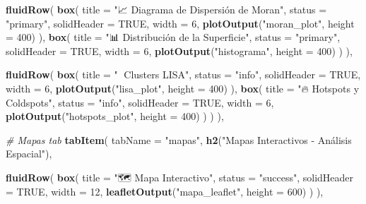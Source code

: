 \documentclass[
]{article}
\newenvironment{Shaded}{\begin{snugshade}}{\end{snugshade}}
\newcommand{\AttributeTok}[1]{\textcolor[rgb]{0.13,0.29,0.53}{#1}}
\newcommand{\CommentTok}[1]{\textcolor[rgb]{0.56,0.35,0.01}{\textit{#1}}}
\newcommand{\ConstantTok}[1]{\textcolor[rgb]{0.56,0.35,0.01}{#1}}
\newcommand{\DecValTok}[1]{\textcolor[rgb]{0.00,0.00,0.81}{#1}}
\newcommand{\FunctionTok}[1]{\textcolor[rgb]{0.13,0.29,0.53}{\textbf{#1}}}
\newcommand{\NormalTok}[1]{#1}
\newcommand{\StringTok}[1]{\textcolor[rgb]{0.31,0.60,0.02}{#1}}
\begin{document}
\begin{Shaded}
\begin{Highlighting}[]
        \FunctionTok{fluidRow}\NormalTok{(}
          \FunctionTok{box}\NormalTok{(}
            \AttributeTok{title =} \StringTok{"📈 Diagrama de Dispersión de Moran"}\NormalTok{, }
            \AttributeTok{status =} \StringTok{"primary"}\NormalTok{, }\AttributeTok{solidHeader =} \ConstantTok{TRUE}\NormalTok{,}
            \AttributeTok{width =} \DecValTok{6}\NormalTok{,}
            \FunctionTok{plotOutput}\NormalTok{(}\StringTok{"moran\_plot"}\NormalTok{, }\AttributeTok{height =} \DecValTok{400}\NormalTok{)}
\NormalTok{          ),}
          \FunctionTok{box}\NormalTok{(}
            \AttributeTok{title =} \StringTok{"📊 Distribución de la Superficie"}\NormalTok{, }
            \AttributeTok{status =} \StringTok{"primary"}\NormalTok{, }\AttributeTok{solidHeader =} \ConstantTok{TRUE}\NormalTok{,}
            \AttributeTok{width =} \DecValTok{6}\NormalTok{,}
            \FunctionTok{plotOutput}\NormalTok{(}\StringTok{"histograma"}\NormalTok{, }\AttributeTok{height =} \DecValTok{400}\NormalTok{)}
\NormalTok{          )}
\NormalTok{        ),}
        
        \FunctionTok{fluidRow}\NormalTok{(}
          \FunctionTok{box}\NormalTok{(}
            \AttributeTok{title =} \StringTok{"🧩 Clusters LISA"}\NormalTok{, }
            \AttributeTok{status =} \StringTok{"info"}\NormalTok{, }\AttributeTok{solidHeader =} \ConstantTok{TRUE}\NormalTok{,}
            \AttributeTok{width =} \DecValTok{6}\NormalTok{,}
            \FunctionTok{plotOutput}\NormalTok{(}\StringTok{"lisa\_plot"}\NormalTok{, }\AttributeTok{height =} \DecValTok{400}\NormalTok{)}
\NormalTok{          ),}
          \FunctionTok{box}\NormalTok{(}
            \AttributeTok{title =} \StringTok{"🔥 Hotspots y Coldspots"}\NormalTok{, }
            \AttributeTok{status =} \StringTok{"info"}\NormalTok{, }\AttributeTok{solidHeader =} \ConstantTok{TRUE}\NormalTok{,}
            \AttributeTok{width =} \DecValTok{6}\NormalTok{,}
            \FunctionTok{plotOutput}\NormalTok{(}\StringTok{"hotspots\_plot"}\NormalTok{, }\AttributeTok{height =} \DecValTok{400}\NormalTok{)}
\NormalTok{          )}
\NormalTok{        )}
\NormalTok{      ),}
      
      \CommentTok{\# Mapas tab}
      \FunctionTok{tabItem}\NormalTok{(}
        \AttributeTok{tabName =} \StringTok{"mapas"}\NormalTok{,}
        \FunctionTok{h2}\NormalTok{(}\StringTok{"Mapas Interactivos {-} Análisis Espacial"}\NormalTok{),}
        
        \FunctionTok{fluidRow}\NormalTok{(}
          \FunctionTok{box}\NormalTok{(}
            \AttributeTok{title =} \StringTok{"🗺️ Mapa Interactivo"}\NormalTok{, }
            \AttributeTok{status =} \StringTok{"success"}\NormalTok{, }\AttributeTok{solidHeader =} \ConstantTok{TRUE}\NormalTok{,}
            \AttributeTok{width =} \DecValTok{12}\NormalTok{,}
            \FunctionTok{leafletOutput}\NormalTok{(}\StringTok{"mapa\_leaflet"}\NormalTok{, }\AttributeTok{height =} \DecValTok{600}\NormalTok{)}
\NormalTok{          )}
\NormalTok{        ),}
        

\end{Highlighting}
\end{Shaded}
\end{document}
